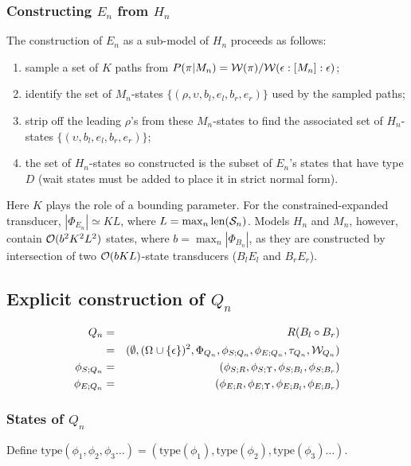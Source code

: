 \documentclass{article}
\newcommand{\seclabel}[1]{\label{sec.#1}}
\newcommand\gappedalphabet[1]{(\Omega_{#1} \cup \{\epsilon\})}
\newcommand\gapsquared{\gappedalphabet{}^2}
\newcommand\wtrans[4]{#1(#2 : [#3] : #4)}
\newcommand\compose{}
\newcommand\fork{\circ}
\newcommand\idfork{\Upsilon}
\newcommand\States{\Phi}
\newcommand\statesof[1]{\States_{#1}}
\newcommand\Transitions{\tau}
\newcommand\transitionsof[1]{\Transitions_{#1}}
\newcommand\startstateof[1]{\phi_{S;#1}}
\newcommand\laststateof[1]{\phi_{E;#1}}
\newcommand\weight{{\cal W}}
\newcommand\weightfunof[1]{\weight_{#1}}
\newcommand\numberofstates[1]{|\statesof{#1}|}
\newcommand\statetype{\mbox{type}}
\newcommand\seqlen[1]{\mbox{len}(#1)}
\newcommand\outputn[1]{{\cal S}_{#1}}
\newcommand\outseqlen[1]{\seqlen{\outputn{#1}}}
\newcommand\order[1]{{\cal O}(#1)}
\newcommand\hstate{(\upsilon,b_l,e_l,b_r,e_r)}
\newcommand\mstate{(\rho,\upsilon,b_l,e_l,b_r,e_r)}
\begin{document}
\subsubsection{Constructing $E_n$ from $H_n$}
The construction of $E_n$ as a sub-model of $H_n$ proceeds as follows:
\begin{enumerate}
\item sample a set of $K$ paths from $P(\pi | M_n) = \weight(\pi) / \wtrans{\weight}{\epsilon}{M_n}{\epsilon}$;
\item identify the set of $M_n$-states $\{\mstate\}$ used by the sampled paths;
\item strip off the leading $\rho$'s from these $M_n$-states to find the associated set of $H_n$-states $\{\hstate\}$;
\item the set of $H_n$-states so constructed is the subset of $E_n$'s states that have type $D$ (wait states must be added to place it in strict normal form).
\end{enumerate}

Here $K$ plays the role of a bounding parameter.
For the constrained-expanded transducer, $\numberofstates{E_n} \simeq KL$, where $L = \max_n \outseqlen{n}$.
Models $H_n$ and $M_n$, however, contain $\order{b^2 K^2 L^2}$ states,
where $b = \max_n \numberofstates{B_n}$,
as they are constructed by intersection of two $\order{bKL}$-state transducers ($B_l \compose E_l$ and $B_r \compose E_r$).

\subsection{Explicit construction of $Q_n$}
\seclabel{Qn}
\begin{eqnarray*}
Q_n & = & R \compose (B_l \fork B_r) \\
& = & (\emptyset,\gapsquared,\statesof{Q_n},\startstateof{Q_n},\laststateof{Q_n},\transitionsof{Q_n},\weightfunof{Q_n}) \\
\startstateof{Q_n} & = & (\startstateof{R},\startstateof{\idfork},\startstateof{B_l},\startstateof{B_r}) \\
\laststateof{Q_n} & = & (\laststateof{R},\laststateof{\idfork},\laststateof{B_l},\laststateof{B_r})
\end{eqnarray*}

\subsubsection{States of $Q_n$}

Define $\statetype(\phi_1,\phi_2,\phi_3 \ldots) = (\statetype(\phi_1), \statetype(\phi_2), \statetype(\phi_3) \ldots)$.
\end{document}
